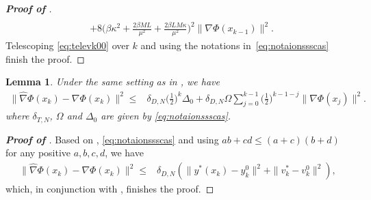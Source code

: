 \documentclass{osudissert96}
\newtheorem{lemma}{Lemma}
\begin{document}
\begin{proof}[\bf Proof of ]
\begin{align}
\\&+8\Big(\beta\kappa^2+\frac{2\beta ML}{\mu^2}+\frac{2\beta LM\kappa}{\mu^2}\Big)^2\|\nabla \Phi(x_{k-1})\|^2.
\end{align}
Telescoping \cref{eq:televk00} over $k$ and using the notations in~\cref{eq:notaionssscas} finish the proof. 
\end{proof}
\begin{lemma}\label{le:gamma1}
Under the same setting as in , we have 
\begin{align*}
\|\widehat \nabla \Phi(x_k)- \nabla \Phi(x_k)\|^2 \leq &\delta_{D,N}\Big(\frac{1}{2}\Big)^k  \Delta_0+ \delta_{D,N}\Omega\sum_{j=0}^{k-1}\Big(\frac{1}{2}\Big)^{k-1-j}\|\nabla \Phi(x_{j})\|^2. \end{align*}
where $\delta_{T,N}$, $\Omega$ and $\Delta_0$ are given by \cref{eq:notaionssscas}.
\end{lemma}
\begin{proof}[\bf Proof of ] 
Based on , \cref{eq:notaionssscas} and using $ab+cd\leq (a+c)(b+d)$ for any positive $a,b,c,d$, we have
\begin{align*}
\|\widehat \nabla \Phi(x_k)- \nabla \Phi(x_k)\|^2 \leq &\delta_{D,N}(\|y^*(x_k)-y_k^0\|^2+\|v_k^*-v_k^0\|^2),
\end{align*}
which, in conjunction with , finishes the proof. 
\end{proof}
\end{document}
